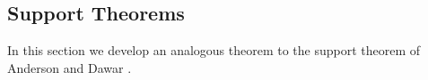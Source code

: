 \documentclass[../paper.tex]{subfiles}
\begin{document}




\subsection{Support Theorems}
In this section we develop an analogous theorem to the support theorem of
Anderson and Dawar \cite{AndersonD17}.
%
\end{document}
